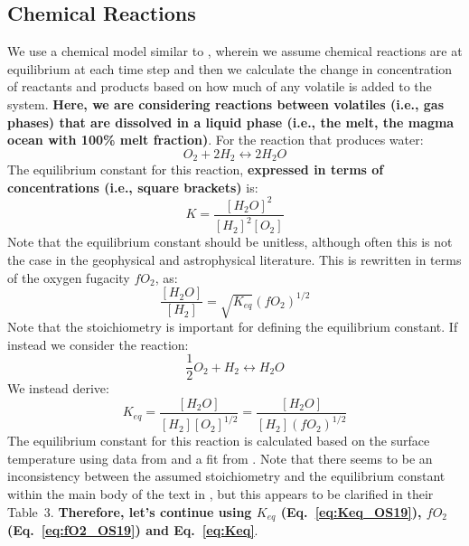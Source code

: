 \subsection{Chemical Reactions}
We use a chemical model similar to \cite{GS14}, wherein we assume chemical reactions are at equilibrium at each time step and then we calculate the change in concentration of reactants and products based on how much of any volatile is added to the system.  \textbf{Here, we are considering reactions between volatiles (i.e., gas phases) that are dissolved in a liquid phase (i.e., the melt, the magma ocean with 100\% melt fraction)}.  For the reaction that produces water:
\begin{equation}
    {O_2} + 2H_2 \leftrightarrow 2H_2O
\end{equation}
The equilibrium constant for this reaction, \textbf{expressed in terms of concentrations (i.e., square brackets)} is:
\begin{equation}
    K = \frac{[H_2O]^2}{[H_2]^2[O_2]}
\end{equation}
Note that the equilibrium constant should be unitless, although often this is not the case in the geophysical and astrophysical literature.
This is rewritten in terms of the oxygen fugacity $fO_2$, as: 
\begin{equation}
    \frac{[H_2O]}{[H_2]} = \sqrt{K_{eq}} \left(fO_2\right)^{1/2}
\end{equation}
Note that the stoichiometry is important for defining the equilibrium constant.  If instead we consider the reaction:
\begin{equation}
    \frac{1}{2} O_2 + H_2 \leftrightarrow H_2O
\end{equation}
We instead derive:
\begin{equation}
     K_{eq} = \frac{[H_2O]}{[H_2] [O_2]^{1/2}} = \frac{[H_2O]}{[H_2] \left(fO_2\right)^{1/2}}
    \label{eq:Keq}
\end{equation}
The equilibrium constant for this reaction is calculated based on the surface temperature using data from \cite{RBF78} and a fit from \cite{OS19}.  Note that there seems to be an inconsistency between the assumed stoichiometry and the equilibrium constant within the main body of the text in \cite{OS19}, but this appears to be clarified in their Table~3.  \textbf{Therefore, let's continue using $K_{eq}$ (Eq.~\ref{eq:Keq_OS19}), $fO_2$ (Eq.~\ref{eq:fO2_OS19}) and Eq.~\ref{eq:Keq}}.
